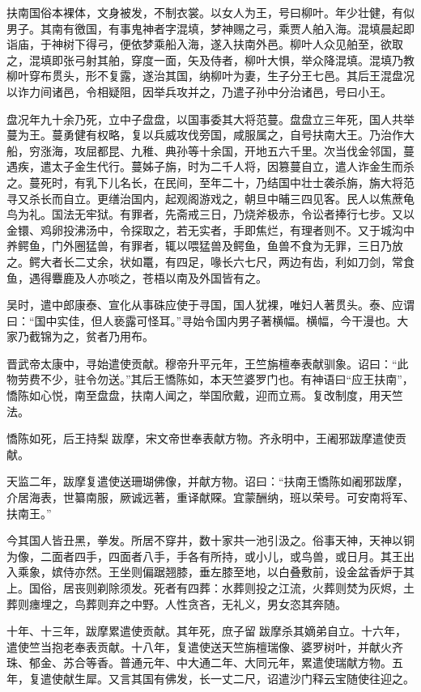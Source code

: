 \documentclass[12pt,UTF8]{ctexbook}
\begin{document}
扶南国俗本裸体，文身被发，不制衣裳。以女人为王，号曰柳叶。年少壮健，有似男子。其南有徼国，有事鬼神者字混填，梦神赐之弓，乘贾人舶入海。混填晨起即诣庙，于神树下得弓，便依梦乘船入海，遂入扶南外邑。柳叶人众见舶至，欲取之，混填即张弓射其舶，穿度一面，矢及侍者，柳叶大惧，举众降混填。混填乃教柳叶穿布贯头，形不复露，遂治其国，纳柳叶为妻，生子分王七邑。其后王混盘况以诈力间诸邑，令相疑阻，因举兵攻并之，乃遣子孙中分治诸邑，号曰小王。

盘况年九十余乃死，立中子盘盘，以国事委其大将范蔓。盘盘立三年死，国人共举蔓为王。蔓勇健有权略，复以兵威攻伐旁国，咸服属之，自号扶南大王。乃治作大船，穷涨海，攻屈都昆、九稚、典孙等十余国，开地五六千里。次当伐金邻国，蔓遇疾，遣太子金生代行。蔓姊子旃，时为二千人将，因篡蔓自立，遣人诈金生而杀之。蔓死时，有乳下儿名长，在民间，至年二十，乃结国中壮士袭杀旃，旃大将范寻又杀长而自立。更缮治国内，起观阁游戏之，朝旦中晡三四见客。民人以焦蔗龟鸟为礼。国法无牢狱。有罪者，先斋戒三日，乃烧斧极赤，令讼者捧行七步。又以金镮、鸡卵投沸汤中，令探取之，若无实者，手即焦烂，有理者则不。又于城沟中养鳄鱼，门外圈猛兽，有罪者，辄以喂猛兽及鳄鱼，鱼兽不食为无罪，三日乃放之。鳄大者长二丈余，状如鼍，有四足，喙长六七尺，两边有齿，利如刀剑，常食鱼，遇得麞鹿及人亦啖之，苍梧以南及外国皆有之。

吴时，遣中郎康泰、宣化从事硃应使于寻国，国人犹裸，唯妇人著贯头。泰、应谓曰：“国中实佳，但人亵露可怪耳。”寻始令国内男子著横幅。横幅，今干漫也。大家乃截锦为之，贫者乃用布。

晋武帝太康中，寻始遣使贡献。穆帝升平元年，王竺旃檀奉表献驯象。诏曰：“此物劳费不少，驻令勿送。”其后王憍陈如，本天竺婆罗门也。有神语曰“应王扶南”，憍陈如心悦，南至盘盘，扶南人闻之，举国欣戴，迎而立焉。复改制度，用天竺法。

憍陈如死，后王持梨跋摩，宋文帝世奉表献方物。齐永明中，王阇邪跋摩遣使贡献。

天监二年，跋摩复遣使送珊瑚佛像，并献方物。诏曰：“扶南王憍陈如阇邪跋摩，介居海表，世纂南服，厥诚远著，重译献賝。宜蒙酬纳，班以荣号。可安南将军、扶南王。”

今其国人皆丑黑，拳发。所居不穿井，数十家共一池引汲之。俗事天神，天神以铜为像，二面者四手，四面者八手，手各有所持，或小儿，或鸟兽，或日月。其王出入乘象，嫔侍亦然。王坐则偏踞翘膝，垂左膝至地，以白叠敷前，设金盆香炉于其上。国俗，居丧则剃除须发。死者有四葬：水葬则投之江流，火葬则焚为灰烬，土葬则瘗埋之，鸟葬则弃之中野。人性贪吝，无礼义，男女恣其奔随。

十年、十三年，跋摩累遣使贡献。其年死，庶子留跋摩杀其嫡弟自立。十六年，遣使竺当抱老奉表贡献。十八年，复遣使送天竺旃檀瑞像、婆罗树叶，并献火齐珠、郁金、苏合等香。普通元年、中大通二年、大同元年，累遣使瑞献方物。五年，复遣使献生犀。又言其国有佛发，长一丈二尺，诏遣沙门释云宝随使往迎之。
\end{document}
